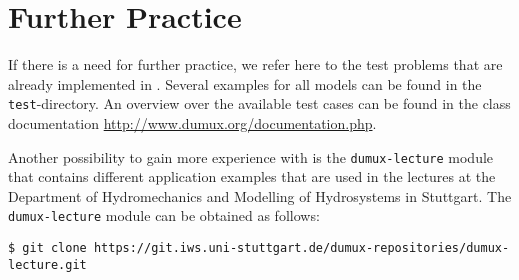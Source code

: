 \section{Further Practice}
\label{tutorial-furtherpractice}

If there is a need for further practice, we refer here to the test problems that
are already implemented in \Dumux. Several examples for all models
can be found in the \texttt{test}-directory. An overview over the available test
cases can be found in the class documentation \url{http://www.dumux.org/documentation.php}.

Another possibility to gain more experience with \Dumux is the \texttt{dumux-lecture} module
that contains different application examples that are used in the lectures at the
Department of Hydromechanics and Modelling of Hydrosystems in Stuttgart.
The \texttt{dumux-lecture} module can be obtained as follows:
\begin{lstlisting}[style=Bash]
$ git clone https://git.iws.uni-stuttgart.de/dumux-repositories/dumux-lecture.git
\end{lstlisting}

